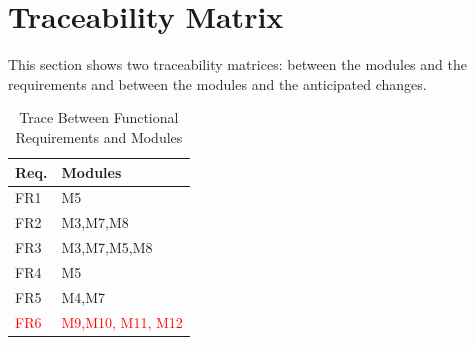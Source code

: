\documentclass[12pt, titlepage]{article}
\begin{document}
\section{Traceability Matrix} \label{SecTM}

This section shows two traceability matrices: between the modules and the
requirements and between the modules and the anticipated changes.

\begin{table}[H]
\centering
\begin{tabular}{p{} p{}}
\toprule
\textbf{Req.} & \textbf{Modules}\\
\midrule
FR1 & M5\\
FR2 & M3,M7,M8\\
FR3 & M3,M7,M5,M8\\
FR4 & M5\\
FR5 & M4,M7\\
\textcolor{red}{FR6} & \textcolor{red}{M9,M10, M11, M12}\\
\bottomrule
\end{tabular}
\caption{Trace Between Functional Requirements and Modules}
\label{TblRT}
\end{table}
\end{document}
